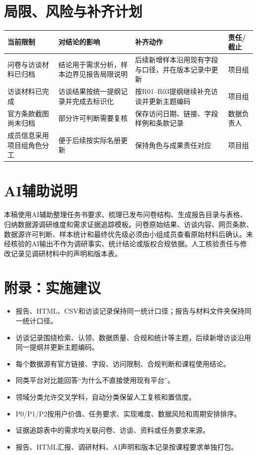 \documentclass[UTF8,11pt,a4paper]{ctexart}
\begin{document}
\section{局限、风险与补齐计划}
\begin{longtable}{p{3.5cm}p{4.0cm}p{5.2cm}p{2.1cm}}
\toprule 当前限制 & 对结论的影响 & 补齐动作 & 责任/截止\\\midrule
问卷与访谈材料已归档 & 结论用于需求分析，样本边界见报告局限说明 & 后续新增样本沿用现有字段与口径，并在版本记录中更新 & 项目组\\
访谈材料已完成 & 访谈结果按统一提纲记录并完成去标识化 & 按R01--R03提纲继续补充访谈并更新主题编码 & 项目组\\
官方条款截图尚未归档 & 部分许可判断需要复核 & 保存访问日期、链接、字段样例和条款记录 & 数据负责人\\
成员信息采用项目组角色分工 & 便于后续按实际名册更新 & 保持角色与成果责任对应 & 项目组\\
\bottomrule
\end{longtable}

\section{AI辅助说明}
本稿使用AI辅助整理任务书要求、梳理已发布问卷结构、生成报告目录与表格、归纳数据源调研维度和需求证据追踪模板。问卷原始结果、访谈内容、网页条款、数据源许可判断、样本统计和最终优先级必须由小组成员查看原始材料后确认。未经核验的AI输出不作为调研事实、统计结论或版权合规依据。人工核验责任与修改记录见调研材料中的声明和版本表。

\section*{附录：实施建议}
\begin{itemize}
\item 报告、HTML、CSV和访谈记录保持同一统计口径；报告与材料文件夹保持同一统计口径。
\item 访谈记录围绕检索、认领、数据质量、合规和统计等主题，后续新增访谈沿用同一提纲并更新主题编码。
\item 每个数据源有官方链接、字段、访问限制、合规判断和课程使用结论。
\item 同类平台对比能回答“为什么不直接使用现有平台”。
\item 领域分类允许交叉学科，自动分类保留人工复核和置信度。
\item P0/P1/P2按用户价值、任务要求、实现难度、数据风险和周期安排排序。
\item 证据追踪表中的需求均关联问卷、访谈、资料或任务要求来源。
\item 报告、HTML汇报、调研材料、AI声明和版本记录按课程要求单独打包。
\end{itemize}
\end{document}

